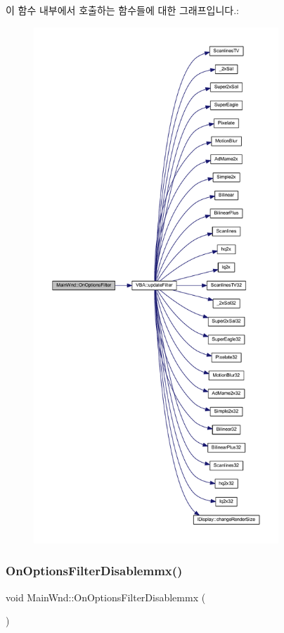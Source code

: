 이 함수 내부에서 호출하는 함수들에 대한 그래프입니다.\+:
\nopagebreak
\begin{figure}[H]
\begin{center}
\leavevmode
\includegraphics[height=550pt]{class_main_wnd_adfab8994e984c069ace4f06dafcbfbd1_cgraph}
\end{center}
\end{figure}
\mbox{\label{class_main_wnd_aec2034cf5c7ea0ff74b1f81cd29a5e10}} 
\subsubsection{\texorpdfstring{On\+Options\+Filter\+Disablemmx()}{OnOptionsFilterDisablemmx()}}
{\footnotesize\ttfamily void Main\+Wnd\+::\+On\+Options\+Filter\+Disablemmx (\begin{DoxyParamCaption}{ }\end{DoxyParamCaption})\hspace{0.3cm}{\ttfamily [protected]}}



